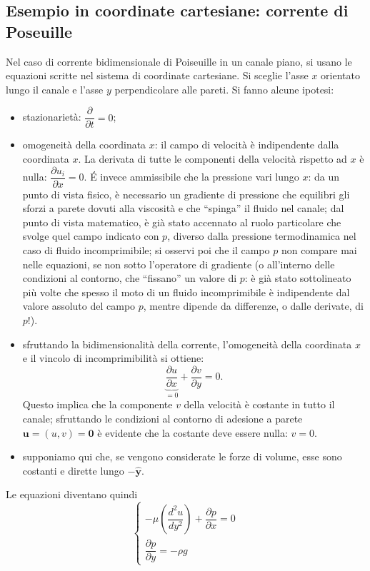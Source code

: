 \subsection{Esempio in coordinate cartesiane: corrente di Poseuille}
Nel caso di corrente bidimensionale di Poiseuille  in un canale piano,
 si usano le equazioni scritte nel sistema di coordinate cartesiane.
Si sceglie l'asse $x$ orientato lungo il canale e l'asse $y$ perpendicolare
 alle pareti.
Si fanno alcune ipotesi:
\begin{itemize}
 \item stazionarietà: $\dfrac{\partial}{\partial t} = 0$;
 \item omogeneità della coordinata $x$: il campo di velocità è indipendente
 dalla coordinata $x$. La derivata di tutte le componenti della velocità
 rispetto ad $x$ è nulla: $\dfrac{\partial u_i}{\partial x} = 0$.
 \'E invece ammissibile che la pressione vari lungo $x$: da un punto di vista fisico,
 è necessario un gradiente di pressione che equilibri gli sforzi
 a parete dovuti alla viscosità e che ``spinga'' il fluido nel canale; dal
 punto di vista matematico, è già stato accennato al ruolo particolare che
 svolge quel campo indicato con $p$, diverso dalla pressione termodinamica
 nel caso di fluido incomprimibile; si osservi poi che il campo $p$ non 
 compare mai nelle equazioni, se non sotto l'operatore di gradiente
 (o all'interno delle condizioni al contorno, che ``fissano'' un valore di
 $p$: è già stato sottolineato più volte che spesso il moto di un fluido
 incomprimibile è indipendente dal valore assoluto del campo $p$, mentre
 dipende da differenze, o dalle derivate, di $p$!).
 \item sfruttando la bidimensionalità della corrente, l'omogeneità della
 coordinata $x$ e il vincolo di incomprimibilità si ottiene:
 \begin{equation}
   \underbrace{\dfrac{\partial u}{\partial x}}_{=0} + \dfrac{\partial v}{\partial y} = 0.
 \end{equation}
 Questo implica che la componente $v$ della velocità è costante in tutto il canale;
 sfruttando le condizioni al contorno di adesione a parete $\bm{u} = (u,v) = \bm{0}$
 è evidente che la costante deve essere nulla: $v = 0$.
 \item supponiamo qui che, se vengono considerate le forze di volume, esse sono
 costanti e dirette lungo $-\bm{\hat{y}}$.
\end{itemize}
Le equazioni diventano quindi
\begin{equation}
\begin{cases}\label{eqn:poiseuille}
- \mu \left( \dfrac{d^2 u}{d y^2} \right)
  + \dfrac{\partial p}{\partial x} = 0 \\
 \dfrac{\partial p}{\partial y} = - \rho g
\end{cases}
\end{equation}
